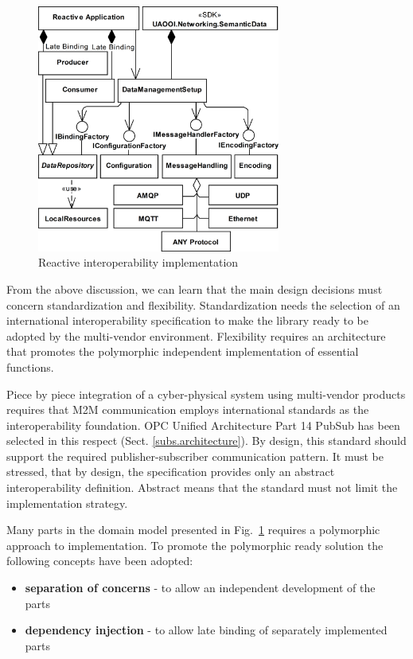 \documentclass{jacsart}
\begin{document}
\begin{figure}
      \centering
      \includegraphics[width=8cm]{../.Media/UADataApplicationArchitecture.png}
      \caption{Reactive interoperability implementation}\label{figure2.UADataApplicationArchitecture}
\end{figure}

From the above discussion, we can learn that the main design decisions must concern standardization and flexibility. Standardization needs the selection of an international interoperability specification to make the library ready to be adopted by the multi-vendor environment. Flexibility requires an architecture that promotes the polymorphic independent implementation of essential functions.

Piece by piece integration of a cyber-physical system using multi-vendor products requires that M2M communication employs international standards as the interoperability foundation. OPC Unified Architecture Part 14 PubSub has been selected in this respect (Sect. \ref*{subs.architecture}). By design, this standard should support the required publisher-subscriber communication pattern. It must be stressed, that by design, the specification provides only an abstract interoperability definition. Abstract means that the standard must not limit the implementation strategy.

Many parts in the domain model presented in Fig.~\ref*{figure2.UADataApplicationArchitecture} requires a polymorphic approach to implementation. To promote the polymorphic ready solution the following concepts have been adopted:

\begin{itemize}
      \item \textbf{separation of concerns} - to allow an independent development of the parts~\cite{RefWorks:doc:5d92609be4b02eb43d372bd1}
      \item \textbf{dependency injection} - to allow late binding of separately implemented parts~\cite{RefWorks:doc:5d925b77e4b030b4e0596f5d}
\end{itemize}
\end{document}
